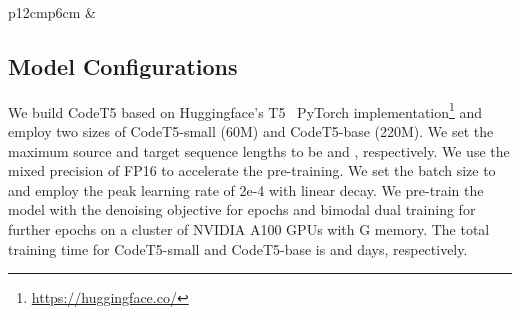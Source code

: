 \documentclass[11pt]{article}
\begin{document}
\begin{table*} [t]
\begin{center}
{\begin{tabular}{p{12cm}p{6cm}}
&
\begin{minipage}{0.36\textwidth}
\captionsetup{type=table}
\vspace{-0.5em}  
\caption{Results on the code defect detection  and clone detection  tasks.}
\label{table:classification}

\end{minipage}
\end{tabular}
}
\end{center}
\vspace{-2em}
\end{table*}

 \subsection{Model Configurations}
We build CodeT5 based on Huggingface's  T5~\cite{DBLP:journals/jmlr/RaffelSRLNMZLL20} PyTorch implementation\footnote{\url{https://huggingface.co/}} and employ two sizes of CodeT5-small (60M) and CodeT5-base (220M).
We set the maximum source and target sequence lengths to be  and , respectively.
We use the mixed precision of FP16 to accelerate the pre-training. We set the batch size to  and employ the peak learning rate of 2e-4 with  linear decay.
We pre-train the model with the denoising objective for  epochs and  bimodal dual training  for further  epochs on a cluster of  NVIDIA A100 GPUs with G memory. 
The total training time for CodeT5-small and CodeT5-base is  and  days, respectively. 
\end{document}
